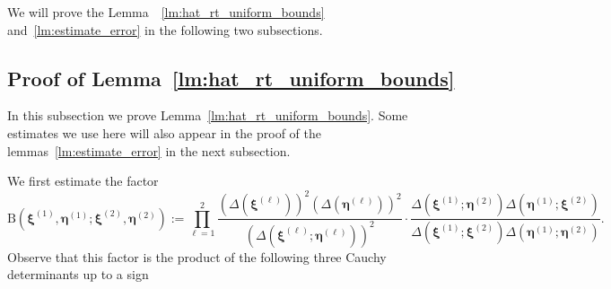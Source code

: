 \documentclass{article}
\numberwithin{equation}{section}
\begin{document}
\bigskip

We will prove the Lemma~~\ref{lm:hat_rt_uniform_bounds} and~\ref{lm:estimate_error} in the following two subsections. 

\subsection{Proof of Lemma~\ref{lm:hat_rt_uniform_bounds}}
\label{sec:proof_lm_uniform_bounds}

In this subsection we prove Lemma~\ref{lm:hat_rt_uniform_bounds}. Some estimates we use here will also appear in the proof of the lemmas~\ref{lm:estimate_error} in the next subsection. 


We first estimate the factor
\begin{equation*}
	\mathrm{B}(\boldsymbol{\xi}^{(1)},\boldsymbol{\eta}^{(1)};\boldsymbol{\xi}^{(2)},\boldsymbol{\eta}^{(2)}):=\prod_{\ell=1}^2
	\frac{\left( \Delta(\boldsymbol{\xi}^{(\ell)}) \right)^2
		\left( \Delta(\boldsymbol{\eta}^{(\ell)}) \right)^2
	}
	{\left( \Delta(\boldsymbol{\xi}^{(\ell)}; \boldsymbol{\eta}^{(\ell)}) \right)^2}
	\cdot 
	\frac{\Delta(\boldsymbol{\xi}^{(1)};\boldsymbol{\eta}^{(2)})
		\Delta(\boldsymbol{\eta}^{(1)};\boldsymbol{\xi}^{(2)})
	}
	{\Delta(\boldsymbol{\xi}^{(1)};\boldsymbol{\xi}^{(2)})
		\Delta(\boldsymbol{\eta}^{(1)};\boldsymbol{\eta}^{(2)})
	}.
\end{equation*}
Observe that this factor is the product of the following three Cauchy determinants up to a sign
\end{document}
